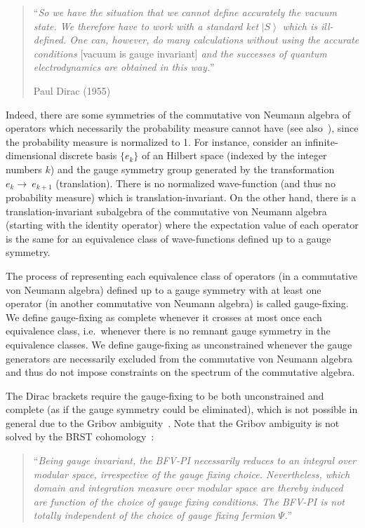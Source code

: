 \documentclass[11pt]{book}
\begin{document}
\begin{quote}
``\emph{So we have the situation that we cannot define accurately the
vacuum state. We therefore have to work with a standard ket
}\(\left|S\right\rangle\)\emph{ which is ill-defined. One can, however,
do many calculations without using the accurate conditions }{[}vacuum is
gauge invariant{]}\emph{ and the successes of quantum electrodynamics
are obtained in this way.}''

Paul Dirac (1955)\cite{Dirac1955Gauge}
\end{quote}

Indeed, there are some symmetries of the commutative von Neumann algebra
of operators which necessarily the probability measure cannot have (see
also~\cite{Klauder2001Quantization}),
since the probability measure is normalized to 1. For instance, consider
an infinite-dimensional discrete basis \(\{e_k\}\) of an Hilbert space
(indexed by the integer numbers \(k\)) and the gauge symmetry group
generated by the transformation \(e_k\to~e_{k+1}\) (translation). There
is no normalized wave-function (and thus no probability measure) which
is translation-invariant. On the other hand, there is a
translation-invariant subalgebra of the commutative von Neumann algebra
(starting with the identity operator) where the expectation value of
each operator is the same for an equivalence class of wave-functions
defined up to a gauge symmetry.

The process of representing each equivalence class of operators (in a
commutative von Neumann algebra) defined up to a gauge symmetry with at
least one operator (in another commutative von Neumann algebra) is
called gauge-fixing. We define gauge-fixing as complete whenever it
crosses at most once each equivalence class, i.e.~whenever there is no
remnant gauge symmetry in the equivalence classes. We define
gauge-fixing as unconstrained whenever the gauge generators are
necessarily excluded from the commutative von Neumann algebra and thus
do not impose constraints on the spectrum of the commutative algebra.

The Dirac brackets require the gauge-fixing to be both unconstrained and
complete (as if the gauge symmetry could be eliminated), which is not
possible in general due to the Gribov
ambiguity~\cite{Henneaux1992Quantization}. Note that the Gribov ambiguity is not solved by the
BRST cohomology~\cite{brst_gaugeinvariance}:

\begin{quote}
``\emph{Being gauge invariant, the BFV-PI necessarily reduces to an
integral over modular space, irrespective of the gauge fixing choice.
Nevertheless, which domain and integration measure over modular space
are thereby induced are function of the choice of gauge fixing
conditions. The BFV-PI is not totally independent of the choice of gauge
fixing fermion }\(\Psi\)\emph{.}''
\end{quote}
\end{document}
